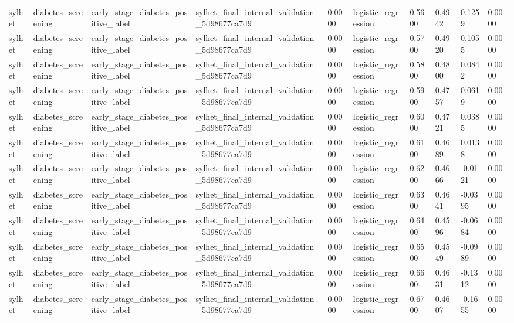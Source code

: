 \begin{tabular}{llllllllll}
sylhet & diabetes\_screening & early\_stage\_diabetes\_positive\_label & sylhet\_final\_internal\_validation\_5d98677ca7d9 & 0.0000 & logistic\_regression & 0.5600 & 0.4942 & 0.1259 & 0.0000 \\
sylhet & diabetes\_screening & early\_stage\_diabetes\_positive\_label & sylhet\_final\_internal\_validation\_5d98677ca7d9 & 0.0000 & logistic\_regression & 0.5700 & 0.4920 & 0.1055 & 0.0000 \\
sylhet & diabetes\_screening & early\_stage\_diabetes\_positive\_label & sylhet\_final\_internal\_validation\_5d98677ca7d9 & 0.0000 & logistic\_regression & 0.5800 & 0.4800 & 0.0842 & 0.0000 \\
sylhet & diabetes\_screening & early\_stage\_diabetes\_positive\_label & sylhet\_final\_internal\_validation\_5d98677ca7d9 & 0.0000 & logistic\_regression & 0.5900 & 0.4757 & 0.0619 & 0.0000 \\
sylhet & diabetes\_screening & early\_stage\_diabetes\_positive\_label & sylhet\_final\_internal\_validation\_5d98677ca7d9 & 0.0000 & logistic\_regression & 0.6000 & 0.4721 & 0.0385 & 0.0000 \\
sylhet & diabetes\_screening & early\_stage\_diabetes\_positive\_label & sylhet\_final\_internal\_validation\_5d98677ca7d9 & 0.0000 & logistic\_regression & 0.6100 & 0.4689 & 0.0138 & 0.0000 \\
sylhet & diabetes\_screening & early\_stage\_diabetes\_positive\_label & sylhet\_final\_internal\_validation\_5d98677ca7d9 & 0.0000 & logistic\_regression & 0.6200 & 0.4666 & -0.0121 & 0.0000 \\
sylhet & diabetes\_screening & early\_stage\_diabetes\_positive\_label & sylhet\_final\_internal\_validation\_5d98677ca7d9 & 0.0000 & logistic\_regression & 0.6300 & 0.4641 & -0.0395 & 0.0000 \\
sylhet & diabetes\_screening & early\_stage\_diabetes\_positive\_label & sylhet\_final\_internal\_validation\_5d98677ca7d9 & 0.0000 & logistic\_regression & 0.6400 & 0.4596 & -0.0684 & 0.0000 \\
sylhet & diabetes\_screening & early\_stage\_diabetes\_positive\_label & sylhet\_final\_internal\_validation\_5d98677ca7d9 & 0.0000 & logistic\_regression & 0.6500 & 0.4549 & -0.0989 & 0.0000 \\
sylhet & diabetes\_screening & early\_stage\_diabetes\_positive\_label & sylhet\_final\_internal\_validation\_5d98677ca7d9 & 0.0000 & logistic\_regression & 0.6600 & 0.4631 & -0.1312 & 0.0000 \\
sylhet & diabetes\_screening & early\_stage\_diabetes\_positive\_label & sylhet\_final\_internal\_validation\_5d98677ca7d9 & 0.0000 & logistic\_regression & 0.6700 & 0.4607 & -0.1655 & 0.0000 \\

\end{tabular}
